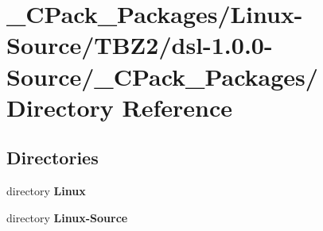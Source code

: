 \section{\_\-CPack\_\-Packages/Linux-\/Source/TBZ2/dsl-\/1.0.0-\/Source/\_\-CPack\_\-Packages/ Directory Reference}
\label{dir_e5a15e137671cfa95d5df5117fc0702c}
\subsection*{Directories}
\begin{DoxyCompactItemize}
\item 
directory {\bf Linux}
\item 
directory {\bf Linux-\/Source}
\end{DoxyCompactItemize}
